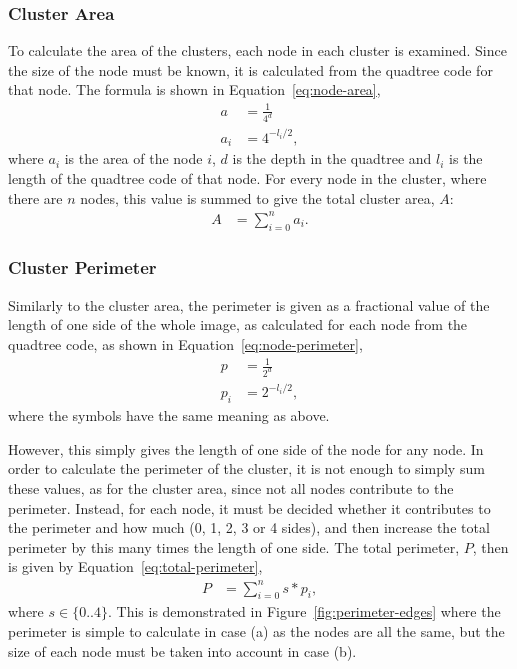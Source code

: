 \subsubsection{Cluster Area}
\label{ssub:cluster_area_node}

To calculate the area of the clusters, each node in each cluster is examined.
Since the size of the node must be known, it is calculated from the quadtree
code for that node. The formula is shown in Equation~\ref{eq:node-area},
\begin{align}
	a &= \frac{1}{4^{d}} \\
	a_i &= 4^{-l_i/2}, \label{eq:node-area}
\end{align}
where $a_i$ is the area of the node $i$, $d$ is the depth in the quadtree and
$l_i$ is the length of the quadtree code of that node. For every node in the
cluster, where there are $n$ nodes, this value is summed to give the total
cluster area, $A$:
\begin{align}
	A &= \sum_{i=0}^{n} a_i.
\end{align}

\subsubsection{Cluster Perimeter}
\label{ssub:cluster_perimeter_node}

Similarly to the cluster area, the perimeter is given as a fractional value of
the length of one side of the whole image, as calculated for each node from the
quadtree code, as shown in Equation~\ref{eq:node-perimeter},
\begin{align}
	p &= \frac{1}{2^{d}} \\
	p_i &= 2^{-l_i/2}, \label{eq:node-perimeter}
\end{align}
where the symbols have the same meaning as above.

However, this simply gives the length of one side of the node for any node. In
order to calculate the perimeter of the cluster, it is not enough to simply
sum these values, as for the cluster area, since not all nodes contribute to
the perimeter. Instead, for each node, it must be decided whether it
contributes to the perimeter and how much (0, 1, 2, 3 or 4 sides), and then
increase the total perimeter by this many times the length of one side. The
total perimeter, $P$, then is given by Equation~\ref{eq:total-perimeter},
\begin{align}
	P &= \sum_{i=0}^{n} s * p_i, \label{eq:total-perimeter}
\end{align}
where $s \in \{0..4\}$. This is demonstrated in
Figure~\ref{fig:perimeter-edges} where the perimeter is simple to calculate in
case (a) as the nodes are all the same, but the size of each node must be taken
into account in case (b).

